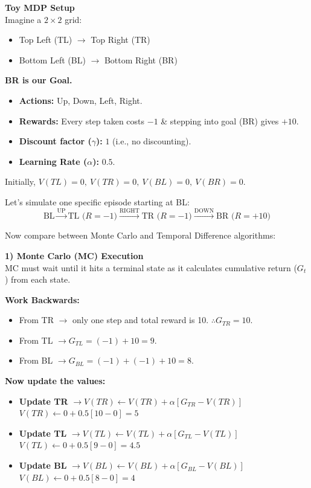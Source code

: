 \textbf{\textcolor{primary}{Toy MDP Setup}} \\
Imagine a $2 \times 2$ grid:
\begin{itemize}
    \item Top Left (TL) $\rightarrow$ Top Right (TR)
    \item Bottom Left (BL) $\rightarrow$ Bottom Right (BR)
\end{itemize}
\textbf{BR is our Goal.}

\begin{itemize}
    \item \textbf{Actions:} Up, Down, Left, Right.
    \item \textbf{Rewards:} Every step taken costs $-1$ \& stepping into goal (BR) gives $+10$.
    \item \textbf{Discount factor ($\gamma$):} $1$ (i.e., no discounting).
    \item \textbf{Learning Rate ($\alpha$):} $0.5$.
\end{itemize}

Initially, $V(TL)=0, \ V(TR)=0, \ V(BL)=0, \ V(BR)=0$.

\vspace{0.3cm}
\noindent Let's simulate one specific episode starting at BL:
\[ \text{BL} \xrightarrow{\text{UP}} \text{TL (} R=-1 \text{)} \xrightarrow{\text{RIGHT}} \text{TR (} R=-1 \text{)} \xrightarrow{\text{DOWN}} \text{BR (} R=+10 \text{)} \]

\noindent Now compare between Monte Carlo and Temporal Difference algorithms:

\vspace{0.5cm}

\textbf{\textcolor{primary}{1) Monte Carlo (MC) Execution}} \\
MC must wait until it hits a terminal state as it calculates cumulative return ($G_t$) from each state.

\textbf{Work Backwards:}
\begin{itemize}
    \item From TR $\rightarrow$ only one step and total reward is 10. $\therefore G_{TR} = 10$.
    \item From TL $\rightarrow G_{TL} = (-1) + 10 = 9$.
    \item From BL $\rightarrow G_{BL} = (-1) + (-1) + 10 = 8$.
\end{itemize}

\textbf{Now update the values:}
\begin{itemize}
    \item \textbf{Update TR} $\rightarrow V(TR) \leftarrow V(TR) + \alpha [G_{TR} - V(TR)]$ \\
    $V(TR) \leftarrow 0 + 0.5[10 - 0] = 5$
    \item \textbf{Update TL} $\rightarrow V(TL) \leftarrow V(TL) + \alpha [G_{TL} - V(TL)]$ \\
    $V(TL) \leftarrow 0 + 0.5[9 - 0] = 4.5$
    \item \textbf{Update BL} $\rightarrow V(BL) \leftarrow V(BL) + \alpha [G_{BL} - V(BL)]$ \\
    $V(BL) \leftarrow 0 + 0.5[8 - 0] = 4$
\end{itemize}

